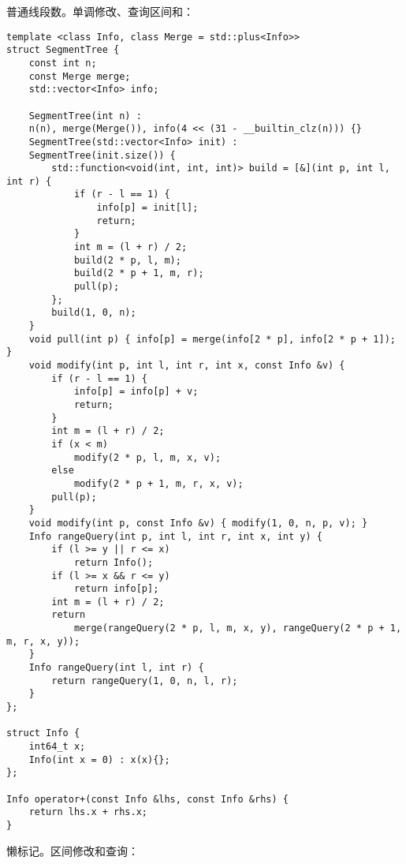 普通线段数。单调修改、查询区间和：
\begin{lstlisting}
template <class Info, class Merge = std::plus<Info>> 
struct SegmentTree {
	const int n;
	const Merge merge;
	std::vector<Info> info;
	
	SegmentTree(int n) : 
	n(n), merge(Merge()), info(4 << (31 - __builtin_clz(n))) {}
	SegmentTree(std::vector<Info> init) : 
	SegmentTree(init.size()) {
		std::function<void(int, int, int)> build = [&](int p, int l, int r) {
			if (r - l == 1) {
				info[p] = init[l];
				return;
			}
			int m = (l + r) / 2;
			build(2 * p, l, m);
			build(2 * p + 1, m, r);
			pull(p);
		};
		build(1, 0, n);
	}
	void pull(int p) { info[p] = merge(info[2 * p], info[2 * p + 1]); }
	void modify(int p, int l, int r, int x, const Info &v) {
		if (r - l == 1) {
			info[p] = info[p] + v;
			return;
		}
		int m = (l + r) / 2;
		if (x < m)
			modify(2 * p, l, m, x, v);
		else
			modify(2 * p + 1, m, r, x, v);
		pull(p);
	}
	void modify(int p, const Info &v) { modify(1, 0, n, p, v); }
	Info rangeQuery(int p, int l, int r, int x, int y) {
		if (l >= y || r <= x) 
			return Info();
		if (l >= x && r <= y) 
			return info[p];
		int m = (l + r) / 2;
		return 
			merge(rangeQuery(2 * p, l, m, x, y), rangeQuery(2 * p + 1, m, r, x, y));
	}
	Info rangeQuery(int l, int r) { 
		return rangeQuery(1, 0, n, l, r); 
	}
};

struct Info {
	int64_t x;
	Info(int x = 0) : x(x){};
};

Info operator+(const Info &lhs, const Info &rhs) { 
	return lhs.x + rhs.x;
}
\end{lstlisting}
懒标记。区间修改和查询：
